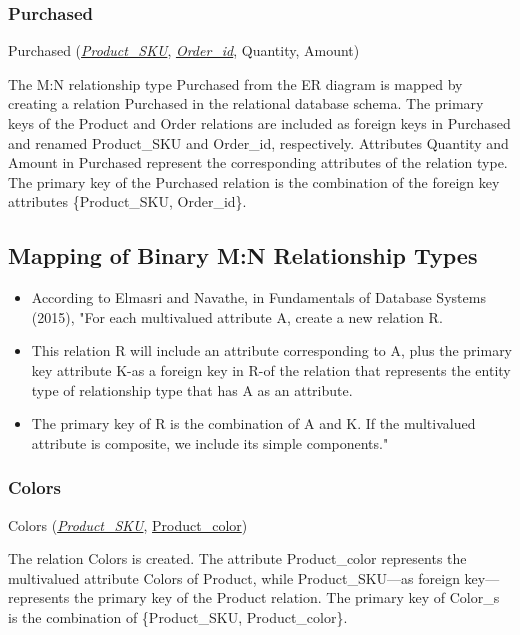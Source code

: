 \documentclass[11pt]{article}
\begin{document}
\subsubsection{Purchased}

Purchased (\underline{\textit{Product\_SKU}}, \underline{\textit{Order\_id}}, Quantity, Amount)

The M:N relationship type Purchased from the ER diagram is mapped by creating a relation Purchased in the relational database schema. The primary keys of the Product and Order relations are included as foreign keys in Purchased and renamed Product\_SKU and Order\_id, respectively. Attributes Quantity and Amount in Purchased represent the corresponding attributes of the relation type. The primary key of the Purchased relation is the combination of the foreign key attributes \{Product\_SKU, Order\_id\}.

\subsection{Mapping of Binary M:N Relationship Types}

\begin{itemize}
  \item According to Elmasri and Navathe, in Fundamentals of Database Systems (2015), "For each multivalued attribute A, create a new relation R.
  \item This relation R will include an attribute corresponding to A, plus the primary key attribute K-as a foreign key in R-of the relation that represents the entity type of relationship type that has A as an attribute.
  \item The primary key of R is the combination of A and K. If the multivalued attribute is composite, we include its simple components." \cite{elmasri}
\end{itemize}

\subsubsection{Colors}

Colors (\underline{\textit{Product\_SKU}}, \underline{Product\_color})

The relation Colors is created. The attribute Product\_color represents the multivalued attribute Colors of Product, while Product\_SKU—as foreign key—represents the primary key of the Product relation. The primary key of Color\_s is the combination of \{Product\_SKU, Product\_color\}.
\end{document}
